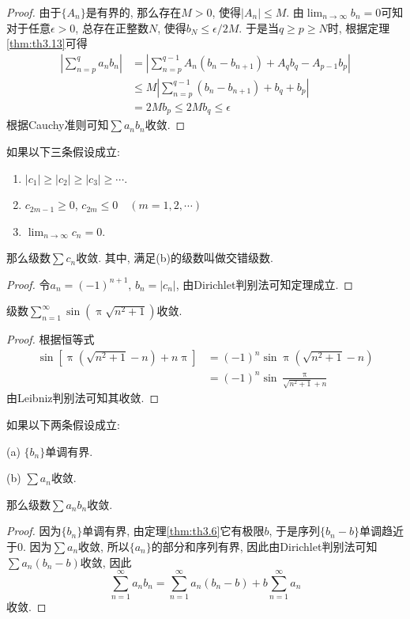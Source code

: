 \documentclass[cn,12pt,math=mtpro2,citestyle=gb7714-2015,bibstyle=gb7714-2015,twocol]{elegantbook}
\newcommand{\limn}{\lim_{n\to\infty}}
\begin{document}
\begin{proof}
  由于$\{A_n\}$是有界的, 那么存在$M>0$, 使得$|A_n|\leq M$. 由$\displaystyle\limn b_n=0$可知对于任意$\epsilon>0$, 总存在正整数$N$, 使得$\displaystyle b_N\leq \epsilon/2M$. 于是当$q\geq p\geq N$时, 根据定理\ref{thm:th3.13}可得
  \begin{align*}
  \left|\sum_{n=p}^{q}a_nb_n\right|&=\left|\sum_{n=p}^{q-1}A_n(b_n-b_{n+1})+A_qb_q-A_{p-1}b_p\right|\\
  &\leq M\left|\sum_{n=p}^{q-1}(b_n-b_{n+1})+b_q+b_p\right| \\
  &=2Mb_p\leq 2Mb_q\leq\epsilon
  \end{align*}
  根据Cauchy准则可知$\sum a_nb_n$收敛.
\end{proof}
\begin{corollary}[Leibniz判别法]
  如果以下三条假设成立:
  \begin{enumerate}[label=(\arabic*)]
  \item $|c_1|\geq |c_2|\geq |c_3|\geq\cdots$.

  \item $c_{2m-1}\geq0$, $c_{2m}\leq0\quad (m=1,2,\cdots)$

  \item $\limn c_n=0$.
  \end{enumerate}
  那么级数$\sum c_n$收敛. 其中, 满足(b)的级数叫做交错级数.
\end{corollary}
\begin{proof}
  令$a_n=(-1)^{n+1}$, $b_n=|c_n|$, 由Dirichlet判别法可知定理成立.
\end{proof}
\begin{example}
级数$\sum_{n=1}^{\infty}\sin\left(\uppi\sqrt{n^2+1}\right)$收敛.
\end{example}
\begin{proof}
  根据恒等式
  \begin{align*}
  \sin\left[\uppi\left(\sqrt{n^2+1}-n\right)+n\uppi\right]&=(-1)^n\sin\uppi\left(\sqrt{n^2+1}-n\right)\\&=(-1)^n\sin\frac{\uppi}{\sqrt{n^2+1}+n}
  \end{align*}
  由Leibniz判别法可知其收敛.
\end{proof}
\begin{theorem}[Abel判别法]
  如果以下两条假设成立:

  (a) $\{b_n\}$单调有界.

  (b) $\sum a_n$收敛.

  \noindent 那么级数$\sum a_nb_n$收敛.
\end{theorem}
\begin{proof}
  因为$\{b_n\}$单调有界, 由定理\ref{thm:th3.6}它有极限$b$, 于是序列$\{b_n-b\}$单调趋近于0. 因为$\sum a_n$收敛, 所以$\{a_n\}$的部分和序列有界, 因此由Dirichlet判别法可知
  $\sum a_n(b_n-b)$收敛, 因此
  $$\sum_{n=1}^{\infty}a_nb_n=\sum_{n=1}^{\infty}a_n(b_n-b)+b\sum_{n=1}^{\infty}a_n$$
  收敛.
\end{proof}
\end{document}
